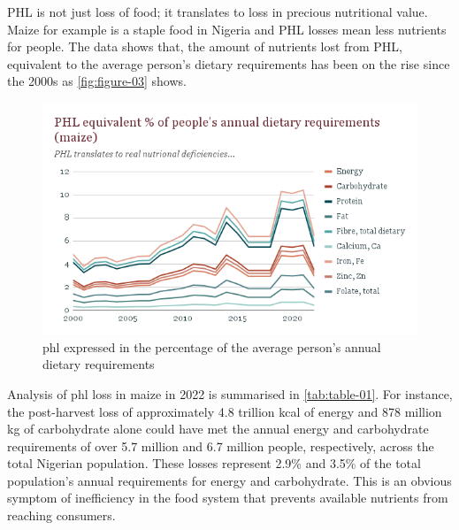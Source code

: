 {PHL is not just loss of food; it translates to loss in precious nutritional value. Maize for example is a staple food in Nigeria and PHL losses mean less nutrients for people. The data shows that, the amount of nutrients lost from PHL, equivalent to the average person's dietary requirements has been on the rise since the 2000s as \autoref{fig:figure-03} shows.

\begin{figure}[H]
    \centering
    \includegraphics[scale=0.7]{Figures/phl_nutritional_maize.png}
    \caption{\acrshort{phl} expressed in the percentage of the average person's annual dietary requirements}
    \label{fig:figure-03}
\end{figure}


Analysis of \acrshort{phl} loss in maize in 2022 is summarised in \autoref{tab:table-01}. For instance, the post-harvest loss of approximately 4.8 trillion kcal of energy and 878 million kg of carbohydrate alone could have met the annual energy and carbohydrate requirements of over 5.7 million and 6.7 million people, respectively, across the total Nigerian population. These losses represent 2.9\% and 3.5\% of the total population's annual requirements for energy and carbohydrate. This is an obvious symptom of inefficiency in the food system that prevents available nutrients from reaching consumers.

}
